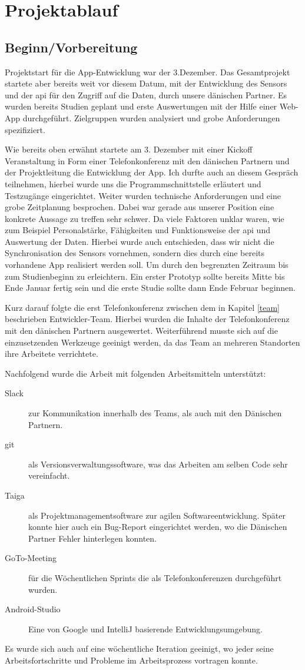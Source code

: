 \section{Projektablauf}
\subsection{Beginn/Vorbereitung}\label{kapBegin}
Projektstart für die App-Entwicklung  war der 3.Dezember. Das Gesamtprojekt startete aber bereits weit vor diesem Datum, mit der Entwicklung des Sensors und der \ac{api} für den Zugriff auf die Daten, durch unsere dänischen Partner. Es wurden bereits Studien geplant und erste Auswertungen mit der Hilfe einer Web-App durchgeführt. Zielgruppen wurden analysiert und grobe Anforderungen spezifiziert.

Wie bereits oben erwähnt startete am 3. Dezember mit einer Kickoff Veranstaltung in Form einer Telefonkonferenz mit den dänischen Partnern und der Projektleitung die Entwicklung der App. Ich durfte auch an diesem Gespräch teilnehmen, hierbei wurde uns die Programmschnittstelle erläutert und Testzugänge eingerichtet.
Weiter wurden technische Anforderungen  und eine grobe Zeitplanung besprochen. Dabei war gerade aus unserer Position eine konkrete Aussage zu treffen sehr schwer. Da viele Faktoren unklar waren, wie zum Beispiel Personalstärke, Fähigkeiten und Funktionsweise der \ac{api} und Auswertung der Daten.
Hierbei wurde auch entschieden, dass wir nicht die Synchronisation des Sensors vornehmen, sondern dies durch eine bereits vorhandene App realisiert werden soll. Um durch den begrenzten Zeitraum bis zum Studienbeginn zu erleichtern. Ein erster Prototyp sollte bereits Mitte bis Ende Januar fertig sein und die erste Studie sollte dann Ende Februar beginnen.

Kurz darauf folgte die erst Telefonkonferenz zwischen dem in Kapitel \ref{team} beschrieben Entwickler-Team. Hierbei wurden die Inhalte der Telefonkonferenz mit den dänischen Partnern ausgewertet.
Weiterführend musste sich auf die einzusetzenden  Werkzeuge geeinigt werden, da das Team an mehreren Standorten ihre Arbeitete verrichtete.

Nachfolgend wurde die Arbeit mit folgenden Arbeitsmitteln unterstützt:
\begin{description}
	\item[Slack] zur Kommunikation innerhalb des Teams, als auch mit den Dänischen Partnern.
	\item[\gls{git}] als Versionsverwaltungssoftware, was das Arbeiten am selben Code sehr vereinfacht.
	\item[Taiga] als Projektmanagementsoftware zur agilen Softwareentwicklung. Später konnte hier auch ein Bug-Report eingerichtet werden, wo die Dänischen Partner Fehler hinterlegen konnten.
	\item[GoTo-Meeting] für die Wöchentlichen Sprints die als  Telefonkonferenzen durchgeführt wurden.
	\item[Android-Studio] Eine von Google und IntelliJ  basierende Entwicklungsumgebung.
\end{description}
 Es wurde sich auch auf eine wöchentliche Iteration geeinigt, wo jeder seine Arbeitsfortschritte und  Probleme im Arbeitsprozess vortragen  konnte.
 
